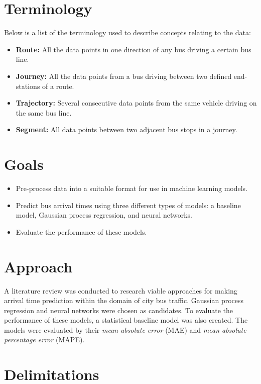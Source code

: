 \section{Terminology}
\label{sec:terminology}
Below is a list of the terminology used to describe concepts relating to the data:
\begin{itemize}
\item \textbf{Route:} All the data points in one direction of any bus driving a certain bus line.
\item \textbf{Journey:} All the data points from a bus driving between two defined end-stations of a route.
\item \textbf{Trajectory:} Several consecutive data points from the same vehicle driving on the same bus line.
\item \textbf{Segment:} All data points between two adjacent bus stops in a journey.
\\
\end{itemize}

\section{Goals}
\label{sec:aim}

\begin{itemize}[]
  \item Pre-process data into a suitable format for use in machine learning models.
  \item Predict bus arrival times using three different types of models: a baseline model, Gaussian process regression, and neural networks.
  \item Evaluate the performance of these models.
\end{itemize}

\section{Approach}
\label{sec:research-questions}

A literature review was conducted to research viable approaches for making arrival time prediction within the domain of city bus traffic. Gaussian process regression and neural networks were chosen as candidates. To evaluate the performance of these models, a statistical baseline model was also created. The models were evaluated by their \textit{mean absolute error} (MAE) and \textit{mean absolute percentage error} (MAPE). 


\section{Delimitations}
\label{sec:delimitations}

